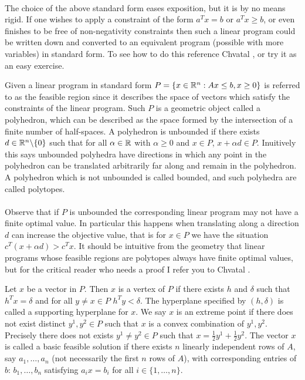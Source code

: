 \paragraph{}The choice of the above standard form eases exposition, but it is by no means rigid. If one wishes to apply a constraint of the form $a^T x = b$ or $a^T x \geq b$, or even finishes to be free of non-negativity constraints then such a linear program could be written down and converted to an equivalent program (possible with more variables) in standard form. To see how to do this reference Chvatal \cite{chvatal1983linear}, or try it as an easy exercise.
\begin{definition} Given a linear program in standard form $P = \{ x \in \mathbb{R}^n: Ax \leq b, x \geq 0 \}$ is referred to as the feasible region since it describes the space of vectors which satisfy the constraints of the linear program. Such $P$ is a geometric object called a polyhedron, which can be described as the space formed by the intersection of a finite number of half-spaces. A polyhedron is unbounded if there exists $d \in \mathbb{R}^n\backslash \{0\}$ such that for all $\alpha \in \mathbb{R}$ with $\alpha \geq 0$ and $x \in P$, $x + \alpha d \in P$. Inuitively this says unbounded polyhedra have directions in which any point in the polyhedron can be translated arbitrarily far along and remain in the polyhedron. A polyhedron which is not unbounded is called bounded, and such polyhedra are called polytopes. 
\end{definition}
\paragraph{}Observe that if $P$ is unbounded the corresponding linear program may not have a finite optimal value. In particular this happens when translating along a direction $d$ can increase the objective value, that is for $x \in P$ we have the situation $c^T(x + \alpha d) > c^Tx$. It should be intuitive from the geometry that linear programs whose feasible regions are polytopes always have finite optimal values, but for the critical reader who needs a proof I refer you to Chvatal \cite{chvatal1983linear}.
\begin{definition}
Let $x$ be a vector in $P$. Then $x$ is a vertex of $P$ if there exists $h$ and $\delta$ such that $h^Tx = \delta$ and for all $y \neq x \in P$ $h^Ty < \delta$. The hyperplane specified by $(h,\delta)$ is called a supporting hyperplane for $x$. We say $x$ is an extreme point if there does not exist distinct $y^1, y^2 \in P$ such that $x$ is a convex combination of $y^1, y^2$. Precisely there does not exists $y^1 \neq y^2 \in P$ such that $x = \frac{1}{2} y^1 + \frac{1}{2}y^2$. The vector $x$ is called a basic feasible solution if there exists $n$ linearly independent rows of $A$, say $a_1, \dots, a_n$ (not necessarily the first $n$ rows of $A$), with corresponding entries of $b$: $b_1, \dots, b_n$ satisfying $a_i x = b_i$ for all $i\in \{1,\dots, n\}$.
\end{definition}
